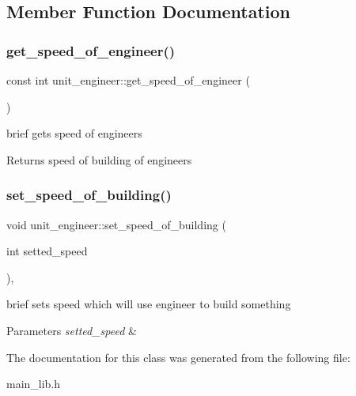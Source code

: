 \subsection{Member Function Documentation}
\mbox{\label{classunit__engineer_a9f3149789f1883a468132a20a96bc7b7}} 
\subsubsection{\texorpdfstring{get\+\_\+speed\+\_\+of\+\_\+engineer()}{get\_speed\_of\_engineer()}}
{\footnotesize\ttfamily const int unit\+\_\+engineer\+::get\+\_\+speed\+\_\+of\+\_\+engineer (\begin{DoxyParamCaption}{ }\end{DoxyParamCaption})\hspace{0.3cm}{\ttfamily [inline]}}

brief gets speed of engineers \begin{DoxyReturn}{Returns}
speed of building of engineers 
\end{DoxyReturn}
\mbox{\label{classunit__engineer_a76ac2640e3e83af2d07c99d124331c12}} 
\subsubsection{\texorpdfstring{set\+\_\+speed\+\_\+of\+\_\+building()}{set\_speed\_of\_building()}}
{\footnotesize\ttfamily void unit\+\_\+engineer\+::set\+\_\+speed\+\_\+of\+\_\+building (\begin{DoxyParamCaption}\item[{int}]{setted\+\_\+speed }\end{DoxyParamCaption})\hspace{0.3cm}{\ttfamily [inline]}, {\ttfamily [protected]}}

brief sets speed which will use engineer to build something 
\begin{DoxyParams}{Parameters}
{\em setted\+\_\+speed} & \\
\hline
\end{DoxyParams}


The documentation for this class was generated from the following file\+:\begin{DoxyCompactItemize}
\item 
main\+\_\+lib.\+h\end{DoxyCompactItemize}
